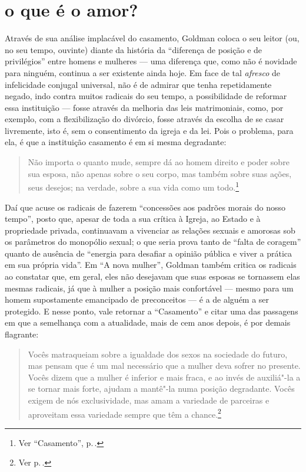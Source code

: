 \section{o que é o amor?}

Através de sua análise implacável do casamento, Goldman coloca o seu
leitor (ou, no seu tempo, ouvinte) diante da história da ``diferença de
posição e de privilégios'' entre homens e mulheres ---
uma diferença que, como não é novidade para ninguém, continua a ser
existente ainda hoje. Em face de tal \textit{afresco} de infelicidade
conjugal universal, não é de admirar que tenha repetidamente negado,
indo contra muitos radicais do seu tempo, a possibilidade de reformar
essa instituição --- fosse através da melhoria das leis
matrimoniais, como, por exemplo, com a flexibilização do divórcio, fosse
através da escolha de se casar livremente, isto é, sem o consentimento
da igreja e da lei. Pois o problema, para ela, é que a instituição
casamento é em si mesma degradante:

\begin{quote}
Não importa o quanto mude, sempre dá ao homem direito e poder sobre sua esposa, não apenas sobre o seu corpo, mas também sobre suas ações, seus desejos; na verdade, sobre a
sua vida como um todo.\footnote{Ver ``Casamento'', p.\,\pageref{cruel}.}
\end{quote}

Daí que acuse
os radicais de fazerem ``concessões aos padrões morais do nosso tempo'',
posto que, apesar de toda a sua crítica à Igreja, ao Estado e à
propriedade privada, continuavam a vivenciar as relações sexuais e
amorosas sob os parâmetros do monopólio sexual; o que seria prova tanto
de ``falta de coragem'' quanto de ausência de ``energia para desafiar a
opinião pública e viver a prática em sua própria vida''. Em ``A nova
mulher'', Goldman também critica os radicais ao constatar que, em geral,
eles não desejavam que suas esposas se tornassem elas mesmas radicais,
já que à mulher a posição mais confortável --- mesmo para um homem
supostamente emancipado de preconceitos --- é a de alguém a ser
protegido. E nesse ponto, vale retornar a ``Casamento'' e
citar uma das passagens em que a semelhança com a atualidade, mais de
cem anos depois, é por demais flagrante:

\begin{quote}
Vocês matraqueiam sobre a igualdade dos sexos na sociedade do futuro, mas
pensam que é um mal necessário que a mulher deva sofrer no presente.
Vocês dizem que a mulher é inferior e mais fraca, e ao invés de
auxiliá"-la a se tornar mais forte, ajudam a mantê"-la numa posição
degradante. Vocês exigem de nós exclusividade, mas amam a variedade de
parceiras e aproveitam essa variedade sempre que têm a chance.\footnote{Ver p.\,\pageref{matraqueiam}.}
\end{quote}

